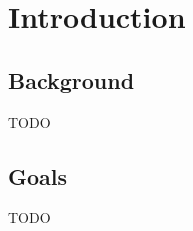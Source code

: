 \chapter{Introduction}\label{chapter:introduction}

\section{Background}
TODO
%
%

\section{Goals}
TODO
